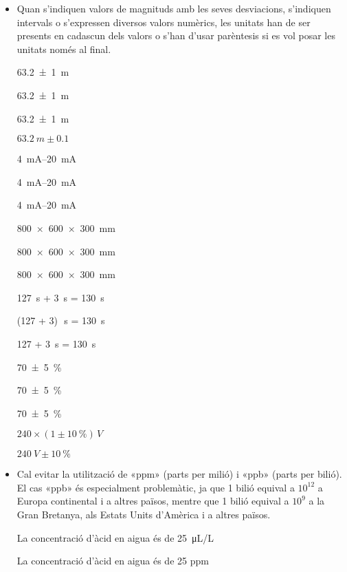\begin{itemize}

\item Quan s'indiquen valors de magnituds amb les seves desviacions,
s'indiquen intervals o s'expressen diversos valors numèrics, les
unitats han de ser presents en cadascun dels valors o s'han d'usar
parèntesis si es vol posar les unitats només al final.

\textcolor{Green}\faCheckSquare{} \SI[separate-uncertainty, multi-part-units = repeat]{63,2(1)}{m}

\textcolor{Green}\faCheckSquare{} \SI[separate-uncertainty]{63,2(1)}{m}

\textcolor{Red}\faTimesCircle{} \SI[separate-uncertainty, multi-part-units = single]{63,2(1)}{m}

\textcolor{Red}\faTimesCircle{}  $\SI{63,2}{m} \pm \num{0,1}$


\textcolor{Green}\faCheckSquare{} \SIrange{4}{20}{mA}

\textcolor{Green}\faCheckSquare{} \SIrange[range-units = brackets]{4}{20}{mA}

\textcolor{Red}\faTimesCircle{} \SIrange[range-units = single]{4}{20}{mA}


\textcolor{Green}\faCheckSquare{} \SI{800 x 600 x 300}{mm}

\textcolor{Green}\faCheckSquare{} \SI[product-units = brackets]{800 x 600 x 300}{mm}

\textcolor{Red}\faTimesCircle{} \SI[product-units = single]{800 x 600 x 300}{mm}


\textcolor{Green}\faCheckSquare{} \SI{127}{s} + \SI{3}{s} = \SI{130}{s}

\textcolor{Green}\faCheckSquare{}  (127 + 3)\si{\,s} = \SI{130}{s}

\textcolor{Red}\faTimesCircle{}  127 + \SI{3}{s} = \SI{130}{s}


\textcolor{Green}\faCheckSquare{} \SI[separate-uncertainty, multi-part-units = repeat]{70(5)}{\percent}

\textcolor{Green}\faCheckSquare{} \SI[separate-uncertainty]{70(5)}{\percent}

\textcolor{Red}\faTimesCircle{} \SI[separate-uncertainty, multi-part-units = single]{70(5)}{\percent}


\textcolor{Green}\faCheckSquare{} $240 \times (1 \pm \SI{10}{\percent})\si{\,V}$

\textcolor{Red}\faTimesCircle{}  $\SI{240}{V} \pm \SI{10}{\percent}$


\item Cal evitar la utilització de «ppm» (parts per milió) i «ppb» (parts per bilió). El cas «ppb» és especialment problemàtic, ja que 1 bilió equival a $10^{12}$ a Europa continental i a altres països, mentre que 1 bilió equival a $10^{9}$ a la Gran Bretanya, als Estats Units d'Amèrica i a altres països.

\textcolor{Green}\faCheckSquare{} La concentració d'àcid en aigua és de \SI{25}{\micro L/L}

\textcolor{Red}\faTimesCircle{} La concentració d'àcid en aigua és de 25 ppm

\end{itemize}


